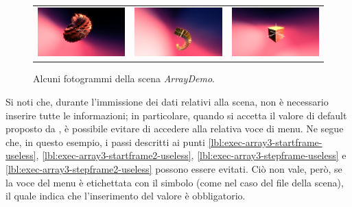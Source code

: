 \begin{enumerate}
\begin{figure}
\begin{tabular}{ccc}
\includegraphics[scale=0.17]{images/array3-7} &
\includegraphics[scale=0.17]{images/array3-8} &
\includegraphics[scale=0.17]{images/array3-9}
\end{tabular}
\caption{Alcuni fotogrammi della scena \emph{ArrayDemo}.}
\label{fig:exec-array3}
\end{figure}
\end{enumerate}
Si noti che, durante l'immissione dei dati relativi alla scena, non \`e necessario inserire tutte le informazioni; in particolare, quando si accetta il valore di default proposto da \mgTheApp{} , \`e possibile evitare di accedere alla relativa voce di menu.
Ne segue che, in questo esempio, i passi descritti ai punti \ref{lbl:exec-array3-startframe-useless}, \ref{lbl:exec-array3-startframe2-useless}, \ref{lbl:exec-array3-stepframe-useless} e \ref{lbl:exec-array3-stepframe2-useless} possono essere evitati.
Ci\`o non vale, per\`o, se la voce del menu \`e etichettata con il simbolo \mgCode{[*]} (come nel caso del file della scena), il quale indica che l'inserimento del valore \`e obbligatorio.


